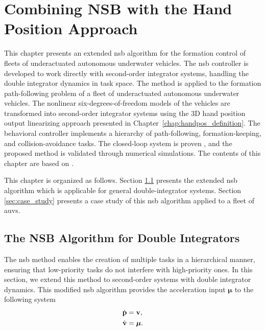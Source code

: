 \chapter{Combining NSB with the Hand Position Approach}
\label{chap:handpos_NSB}

This chapter presents an extended \acrfull{nsb} algorithm for the formation control of fleets of underactuated autonomous underwater vehicles. 
The \gls{nsb} controller is developed to work directly with second-order integrator systems, handling the double integrator dynamics in task space. 
The method is applied to the formation path-following problem of a fleet of underactuated autonomous underwater vehicles. 
The nonlinear six-degrees-of-freedom models of the vehicles are transformed into second-order integrator systems using the 3D hand position output linearizing approach presented in Chapter~\ref{chap:handpos_definition}. 
The behavioral controller implements a hierarchy of path-following, formation-keeping, and collision-avoidance tasks.
The closed-loop system is proven , and the proposed method is validated through numerical simulations.
The contents of this chapter are based on \cite{lie_formation_2023}.

This chapter is organized as follows. Section \ref{sec:NSB} presents the extended \gls{nsb} algorithm which is applicable for general double-integrator systems. Section \ref{sec:case_study} presents a case study of this \gls{nsb} algorithm applied to a fleet of \glspl{auv}.

\section{The NSB Algorithm for Double Integrators}\label{sec:NSB}
The \gls{nsb} method enables the creation of multiple tasks in a hierarchical manner, ensuring that low-priority tasks do not interfere with high-priority ones. In this section, we extend this method to second-order systems with double integrator dynamics.
This modified \gls{nsb} algorithm provides the acceleration input $\bm{\mu}$ to the following system
\begin{subequations}
    \begin{align}
        \dot{\mathbf{p}} &= \mathbf{v}, \\
        \dot{\mathbf{v}} &= \bm{\mu}.
    \end{align}
\end{subequations}

